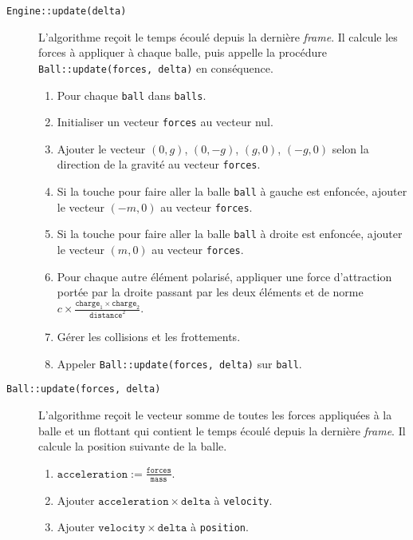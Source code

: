 \begin{description}
    \item[\texttt{Engine::update(delta)}]
    L'algorithme reçoit le temps écoulé depuis la dernière \emph{frame}. Il
    calcule les forces à appliquer à chaque balle, puis appelle la procédure
    \texttt{Ball::update(forces, delta)} en conséquence.
    \begin{enumerate}
        \item Pour chaque \texttt{ball} dans \texttt{balls}.
        \item Initialiser un vecteur \texttt{forces} au vecteur nul.
        \item Ajouter le vecteur $(0, g)$, $(0, -g)$, $(g, 0)$, $(-g, 0)$
        selon la direction de la gravité au vecteur \texttt{forces}.
        \item Si la touche pour faire aller la balle \texttt{ball}
        à gauche est enfoncée, ajouter le vecteur $(-m, 0)$ au
        vecteur \texttt{forces}.
        \item Si la touche pour faire aller la balle \texttt{ball}
        à droite est enfoncée, ajouter le vecteur $(m, 0)$ au
        vecteur \texttt{forces}.
        \item Pour chaque autre élément polarisé, appliquer une
        force d'attraction portée par la droite passant par les
        deux éléments et de norme $c \times \frac{\mathtt{charge}_1 \times \mathtt{charge}_2}{\mathtt{distance}^2}$.
        \item Gérer les collisions et les frottements.
        \item Appeler \texttt{Ball::update(forces, delta)} sur \texttt{ball}.
    \end{enumerate}

    \item[\texttt{Ball::update(forces, delta)}]
    L'algorithme reçoit le vecteur somme de toutes les forces appliquées
    à la balle et un flottant qui contient le temps écoulé depuis la
    dernière \emph{frame}. Il calcule la position suivante de la balle.
    \begin{enumerate}
        \item $\mathtt{acceleration} := \frac{\mathtt{forces}}{\mathtt{mass}}$.
        \item Ajouter $\mathtt{acceleration} \times \mathtt{delta}$ à \texttt{velocity}.
        \item Ajouter $\mathtt{velocity} \times \mathtt{delta}$ à \texttt{position}.
    \end{enumerate}
\end{description}

